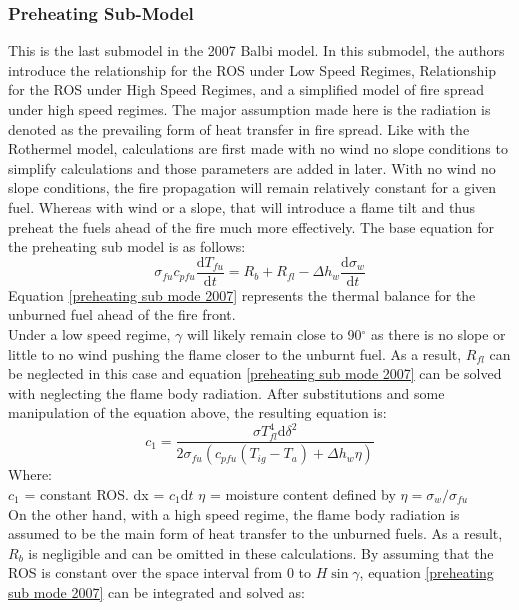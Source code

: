 \documentclass{article}
\begin{document}
\subsubsection{Preheating Sub-Model}
\indent This is the last submodel in the 2007 Balbi model. In this submodel, the authors introduce the relationship for the ROS under Low Speed Regimes, Relationship for the ROS under High Speed Regimes, and a simplified model of fire spread under high speed regimes. The major assumption made here is the radiation is denoted as the prevailing form of heat transfer in fire spread. Like with the Rothermel model, calculations are first made with no wind no slope conditions to simplify calculations and those parameters are added in later. With no wind no slope conditions, the fire propagation will remain relatively constant  for a given fuel. Whereas with wind or a slope, that will introduce a flame tilt and thus preheat the fuels ahead of the fire much more effectively. The base equation for the preheating sub model is as follows:
\begin{equation}
	\label{preheating sub mode 2007}
	\sigma _ {fu} c _{pfu} \frac {\mathrm{d} T_{fu}} {\mathrm{d} t} = R_b + R_{fl} - \Delta h_w \frac {\mathrm{d} \sigma _ w } {\mathrm {d} t}
\end{equation}
Equation \ref{preheating sub mode 2007} represents the thermal balance for the unburned fuel ahead of the fire front. \\
\indent Under a low speed regime, $\gamma$ will likely remain close to 90$^{\circ}$ as there is no slope or little to no wind pushing the flame closer to the unburnt fuel. As a result, $R_{fl}$ can be neglected in this case and equation \ref{preheating sub mode 2007} can be solved with neglecting the flame body radiation. After substitutions and some manipulation of the equation above, the resulting equation is:
\begin{equation}
	\label{low regime ros}
	c_1 = \frac {\sigma T^{4}_{fl} \mathrm {d} \delta ^ 2} {2 \sigma _ {fu} (c_{pfu}(T_{ig} - T_a) + \Delta h _ w \eta)}
\end{equation}
Where:\\
$c_1$ = constant ROS. 
dx = $c_1 \mathrm{d}t$
$\eta$ = moisture content defined by $\eta = \sigma _ w / \sigma _ {fu}$ \\
\indent On the other hand, with a high speed regime, the flame body radiation is assumed to be the main form of heat transfer to the unburned fuels. As a result, $R_b$ is negligible and can be omitted in these calculations. By assuming that the ROS is constant over the space interval from 0 to $H \sin \gamma$, equation \ref{preheating sub mode 2007} can be integrated and solved as:
\end{document}
